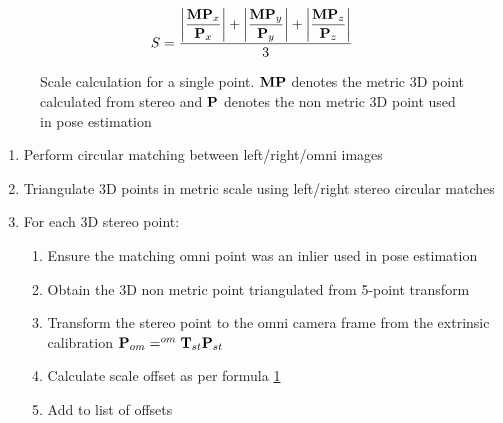 \begin{figure}[h]
  \centering
  \begin{align}
   S =
   \displaystyle\frac{
   \left|\displaystyle\frac{\mathbf {MP}_{x}}{\mathbf P_{x}}\right| + 
   \left|\displaystyle\frac{\mathbf {MP}_{y}}{\mathbf P_{y}}\right| + 
   \left|\displaystyle\frac{\mathbf {MP}_{z}}{\mathbf P_{z}}\right|
   }
   {3}
  \end{align}
  \caption{Scale calculation for a single point.  $\mathbf{MP}$ denotes the metric 3D point calculated from stereo and $\mathbf{P}$ denotes the non metric 3D point used in pose estimation}
  \label{fig:scale_offset}
\end{figure}

\begin{enumerate}
\itemsep0em
 \item Perform circular matching between left/right/omni images %
 \item Triangulate 3D points in metric scale using left/right stereo circular matches
 \item For each 3D stereo point:
 \begin{enumerate}
   \item Ensure the matching omni point was an inlier used in pose estimation
   \item Obtain the 3D non metric point triangulated from 5-point transform
   \item Transform the stereo point to the omni camera frame from the extrinsic calibration $\mathbf P_{om} =  ^{om}\mathbf T_{st} \mathbf P_{st}$
   \item Calculate scale offset as per formula \ref{fig:scale_offset} %
   \item Add to list of offsets 
 \end{enumerate}
\end{enumerate} 

